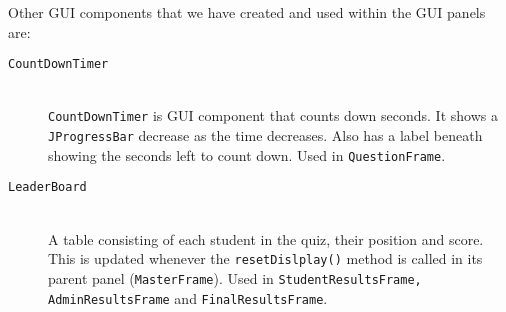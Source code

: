\begin{enumerate}
\begin{description}
    \end{description}

    Other GUI components that we have created and used within the GUI panels are:

    \begin{description}

        \item[\texttt{CountDownTimer}]\hfill \\ \texttt{CountDownTimer} is GUI
            component that counts down seconds. It shows a
            \texttt{JProgressBar} decrease as the time decreases. Also has a
            label beneath showing the seconds left to count down. Used in
            \texttt{QuestionFrame}.

        \item[\texttt{LeaderBoard}]\hfill \\ A table consisting of each student
            in the quiz, their position and score. This is updated whenever the
            \verb+resetDislplay()+ method is called in its parent panel
            (\texttt{MasterFrame}). Used in \texttt{StudentResultsFrame,}
            \texttt{AdminResultsFrame} and \texttt{FinalResultsFrame}.

    \end{description}

\end{enumerate}
